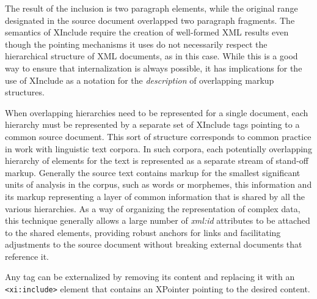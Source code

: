 \par\egroup 
 The result of the inclusion is two paragraph elements, while the original range designated in the source document overlapped two paragraph fragments.  The semantics of XInclude require the creation of well-formed XML results even though the pointing mechanisms it uses do not necessarily respect the hierarchical structure of XML documents, as in this case. While this is a good way to ensure that internalization is always possible, it has implications for the use of XInclude as a notation for the \textit{description} of overlapping markup structures.\par
When overlapping hierarchies need to be represented for a single document, each hierarchy must be represented by a separate set of XInclude tags pointing to a common source document. This sort of structure corresponds to common practice in work with linguistic text corpora. In such corpora, each potentially overlapping hierarchy of elements for the text is represented as a separate stream of stand-off markup. Generally the source text contains markup for the smallest significant units of analysis in the corpus, such as words or morphemes, this information and its markup representing a layer of common information that is shared by all the various hierarchies. As a way of organizing the representation of complex data, this technique generally allows a large number of {\itshape xml:id} attributes to be attached to the shared elements, providing robust anchors for links and facilitating adjustments to the source document without breaking external documents that reference it.\par
Any tag can be externalized by  removing its content and replacing it with an \texttt{<xi:include>} element that contains an XPointer pointing to the desired content.\par
